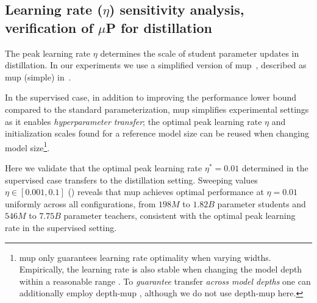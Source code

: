 \FloatBarrier

\subsection{Learning rate (\texorpdfstring{$\eta$}{eta}) sensitivity analysis, verification of \texorpdfstring{$\mu$}{mu}P for distillation} \label{ssec:lr-sensitivity}
The peak learning rate $\eta$ determines the scale of student parameter updates in distillation.
In our experiments we use a simplified version of
\gls{mup}~\citep{DBLP:conf/icml/YangH21,DBLP:journals/corr/abs-2308-01814,DBLP:journals/corr/abs-2203-03466,DBLP:journals/corr/abs-2309-14322,DBLP:journals/corr/abs-2310-17813},
described as \gls{mup} (simple) in~\cite{DBLP:conf/iclr/WortsmanLXEAACG24}.

In the supervised case,
in addition to improving the performance lower bound compared to the standard parameterization,
\gls{mup} simplifies experimental settings as it enables \emph{hyperparameter transfer}; the optimal peak learning rate $\eta$ and initialization scales found for a reference model size can be reused when changing model size\footnote{\gls{mup} only guarantees learning rate optimality when varying widths.
Empirically, the learning rate is also stable when changing the model depth within a reasonable range \citep{DBLP:journals/corr/abs-2203-03466}.
To \emph{guarantee} transfer \emph{across model depths} one can additionally employ depth-\gls{mup} \citep{DBLP:conf/iclr/YangYZH24},
although we do not use depth-\gls{mup} here.
}.

Here we validate that the optimal peak learning rate $\eta^*=0.01$
determined in the supervised case transfers to the distillation setting.
Sweeping values $\eta \in [0.001, 0.1]$ () reveals that \gls{mup} achieves optimal performance at $\eta = 0.01$ uniformly across all configurations, from $198M$ to $1.82B$ parameter students and $546M$ to $7.75B$ parameter teachers,
consistent with the optimal peak learning rate in the supervised setting.


